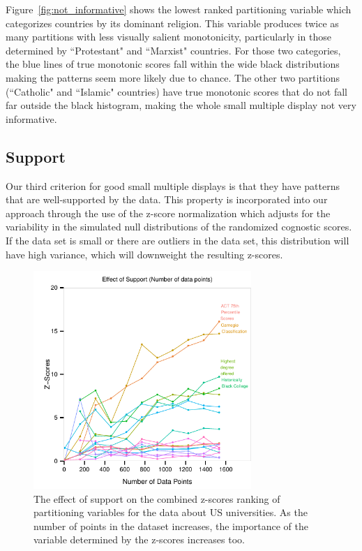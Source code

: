 Figure~\ref{fig:not_informative} shows the lowest ranked partitioning variable which categorizes countries by its dominant religion. This variable produces twice as many partitions with less visually salient monotonicity, particularly in those determined by ``Protestant" and ``Marxist" countries. For those two categories, the blue lines of true monotonic scores fall within the wide black distributions making the patterns seem more likely due to chance. The other two partitions (``Catholic" and ``Islamic" countries) have true monotonic scores that do not fall far outside the black histogram, making the whole small multiple display not very informative.


\subsection{Support}
Our third criterion for good small multiple displays is that they have patterns that are well-supported by the data. This property is incorporated into our approach through the use of the z-score normalization which adjusts for the variability in the simulated null distributions of the randomized cognostic scores. If the data set is small or there are outliers in the data set, this distribution will have high variance, which will downweight the resulting z-scores.

\begin{figure}
\centering
\includegraphics[width=3.25in,height=3.25in]{images/support-nogrid.pdf}
  \caption{The effect of support on the combined z-scores ranking of partitioning variables for the data about US universities. As the number of points in the dataset increases, the importance of the variable determined by the z-scores increases too. }
 \label{fig:support}
\end{figure}

